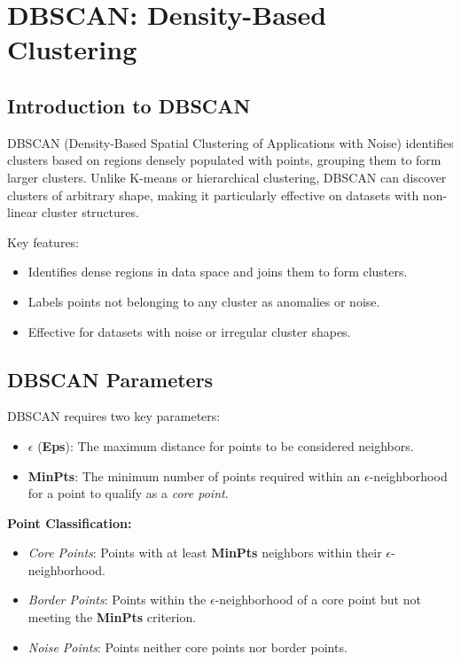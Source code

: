 \documentclass[12pt,a4paper]{article}
\begin{document}
\section{DBSCAN: Density-Based Clustering}

\subsection{Introduction to DBSCAN}
DBSCAN (Density-Based Spatial Clustering of Applications with Noise) identifies clusters based on regions densely populated with points, grouping them to form larger clusters. Unlike K-means or hierarchical clustering, DBSCAN can discover clusters of arbitrary shape, making it particularly effective on datasets with non-linear cluster structures.

Key features:
\begin{itemize}
    \item Identifies dense regions in data space and joins them to form clusters.
    \item Labels points not belonging to any cluster as anomalies or noise.
    \item Effective for datasets with noise or irregular cluster shapes.
\end{itemize}

\subsection{DBSCAN Parameters}
DBSCAN requires two key parameters:
\begin{itemize}
    \item $\epsilon$ (\textbf{Eps}): The maximum distance for points to be considered neighbors.
    \item \textbf{MinPts}: The minimum number of points required within an $\epsilon$-neighborhood for a point to qualify as a \textit{core point}.
\end{itemize}

\textbf{Point Classification:}
\begin{itemize}
    \item \textit{Core Points}: Points with at least \textbf{MinPts} neighbors within their $\epsilon$-neighborhood.
    \item \textit{Border Points}: Points within the $\epsilon$-neighborhood of a core point but not meeting the \textbf{MinPts} criterion.
    \item \textit{Noise Points}: Points neither core points nor border points.
\end{itemize}
\end{document}
